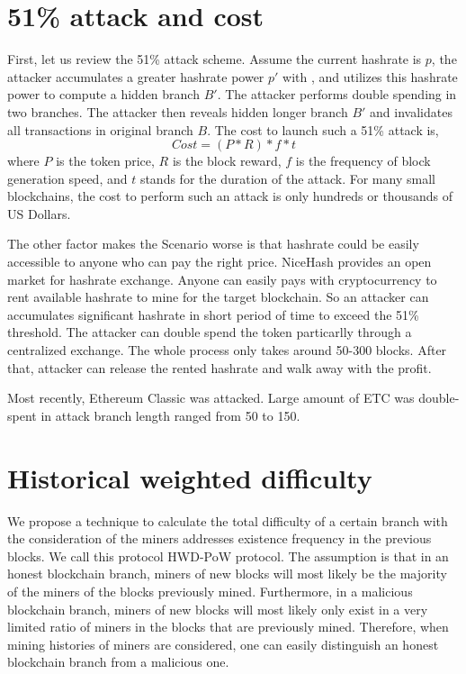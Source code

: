 \documentclass[conference]{IEEEtran}
\begin{document}
\section{51\% attack and cost}
First, let us review the 51\% attack scheme. Assume the current hashrate is $p$, the attacker accumulates a greater hashrate power $p'$ with , and utilizes this hashrate power to compute a hidden branch $B'$. The attacker performs double spending in two branches. The attacker then reveals hidden longer branch $B'$ and invalidates all transactions in original branch $B$. The cost to launch such a 51\% attack is,
\begin{equation}
Cost=(P*R)*f*t\label{eq}
\end{equation}
where $P$ is the token price, $R$ is the block reward, $f$ is the frequency of block generation speed, and $t$ stands for the duration of the attack.
For many small blockchains, the cost to perform such an attack is only hundreds or thousands of US Dollars\cite{b9}.

The other factor makes the Scenario worse is that hashrate could be easily accessible to anyone who can pay the right price. NiceHash\cite{b10} provides an open market for hashrate exchange. Anyone can easily pays with cryptocurrency to rent available hashrate to mine for the target blockchain. So an attacker can accumulates significant hashrate in short period of time to exceed the 51\% threshold. The attacker can double spend the token particarlly through a centralized exchange. The whole process only takes around 50-300 blocks. After that, attacker can release the rented hashrate and walk away with the profit. 

Most recently, Ethereum Classic\cite{b11} was attacked. Large amount of ETC was double-spent in attack branch length ranged from 50 to 150.

\section{Historical weighted difficulty}

We propose a technique to calculate the total difficulty of a certain branch with the consideration of the miners addresses existence frequency in the previous blocks. We call this protocol HWD-PoW protocol. The assumption is that in an honest blockchain branch, miners of new blocks will most likely be the majority of the miners of the blocks previously mined. Furthermore, in a malicious blockchain branch, miners of new blocks will most likely only exist in a very limited ratio of miners in the blocks that are previously mined. Therefore, when mining histories of miners are considered, one can easily distinguish an honest blockchain branch from a malicious one.
\end{document}
